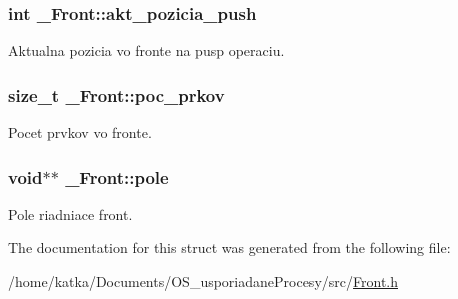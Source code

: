 \subsubsection[{\texorpdfstring{akt\+\_\+pozicia\+\_\+push}{akt_pozicia_push}}]{\setlength{\rightskip}{0pt plus 5cm}int \+\_\+\+Front\+::akt\+\_\+pozicia\+\_\+push}\hypertarget{struct__Front_a0931c8786584f8671ec4b7c42ba2bdee}{}\label{struct__Front_a0931c8786584f8671ec4b7c42ba2bdee}
Aktualna pozicia vo fronte na pusp operaciu. 
\subsubsection[{\texorpdfstring{poc\+\_\+prkov}{poc_prkov}}]{\setlength{\rightskip}{0pt plus 5cm}size\+\_\+t \+\_\+\+Front\+::poc\+\_\+prkov}\hypertarget{struct__Front_a4eadefd147ef83ec0a5f855046ad192a}{}\label{struct__Front_a4eadefd147ef83ec0a5f855046ad192a}
Pocet prvkov vo fronte. 
\subsubsection[{\texorpdfstring{pole}{pole}}]{\setlength{\rightskip}{0pt plus 5cm}void$\ast$$\ast$ \+\_\+\+Front\+::pole}\hypertarget{struct__Front_aaeb70caeedb19e72ba106f621e496942}{}\label{struct__Front_aaeb70caeedb19e72ba106f621e496942}
Pole riadniace front. 

The documentation for this struct was generated from the following file\+:\begin{DoxyCompactItemize}
\item 
/home/katka/\+Documents/\+O\+S\+\_\+usporiadane\+Procesy/src/\hyperlink{Front_8h}{Front.\+h}\end{DoxyCompactItemize}
